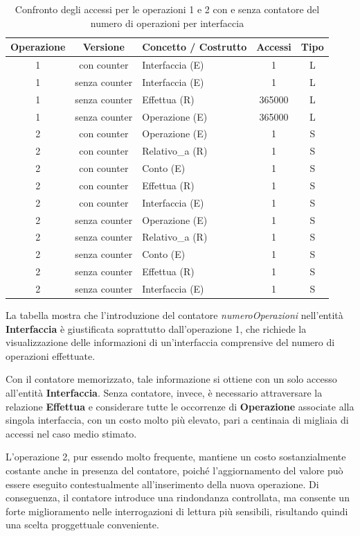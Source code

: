 \begin{table}[H]
  \centering
  \begin{tabular}{|c|c|l|c|c|}
    \hline
    \textbf{Operazione} & \textbf{Versione} & \textbf{Concetto / Costrutto} & \textbf{Accessi} & \textbf{Tipo} \\
    \hline
    1 & con counter & Interfaccia (E) & 1 & L \\
    \hline
    1 & senza counter & Interfaccia (E) & 1 & L \\
    1 & senza counter & Effettua (R) & 365000 & L \\
    1 & senza counter & Operazione (E) & 365000 & L \\
    \hline
    2 & con counter & Operazione (E) & 1 & S \\
    2 & con counter & Relativo\_a (R) & 1 & S \\
    2 & con counter & Conto (E) & 1 & S \\
    2 & con counter & Effettua (R) & 1 & S \\
    2 & con counter & Interfaccia (E) & 1 & S \\
    \hline
    2 & senza counter & Operazione (E) & 1 & S \\
    2 & senza counter & Relativo\_a (R) & 1 & S \\
    2 & senza counter & Conto (E) & 1 & S \\
    2 & senza counter & Effettua (R) & 1 & S \\
    2 & senza counter & Interfaccia (E) & 1 & S \\
    \hline
  \end{tabular}
  \caption{Confronto degli accessi per le operazioni 1 e 2 con e senza contatore del numero di operazioni per interfaccia}
  \label{tab:counter_accessi}
\end{table}

La tabella mostra che l'introduzione del contatore \textit{numeroOperazioni} nell'entità \textbf{Interfaccia} è giustificata soprattutto dall'operazione 1, che richiede la visualizzazione
delle informazioni di un'interfaccia comprensive del numero di operazioni effettuate.

Con il contatore memorizzato, tale informazione si ottiene con un solo accesso all'entità \textbf{Interfaccia}. Senza contatore, invece, è necessario attraversare la relazione
\textbf{Effettua} e considerare tutte le occorrenze di \textbf{Operazione} associate alla singola interfaccia, con un costo molto più elevato, pari a
centinaia di migliaia di accessi nel caso medio stimato.

L'operazione 2, pur essendo molto frequente, mantiene un costo sostanzialmente costante anche in presenza del contatore, poiché l'aggiornamento del valore può essere eseguito contestualmente
all'inserimento della nuova operazione. Di conseguenza, il contatore introduce una rindondanza controllata, ma consente un forte miglioramento nelle interrogazioni di lettura più sensibili,
risultando quindi una scelta proggettuale conveniente.
